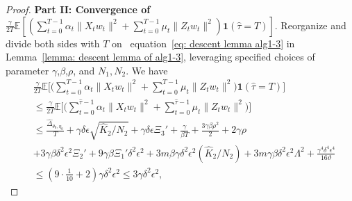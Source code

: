 \documentclass[twoside]{article} %
\def\eqref#1{equation~\ref{#1}}
\theoremstyle{plain}
\theoremstyle{definition}
\theoremstyle{remark}
\newcommand{\htau}{\hat{\tau}}
\begin{document}
\begin{proof}
\textbf{Part II: Convergence of $\frac{\gamma}{2T}\mathbb{E}[(\sum_{t=0}^{T-1}\alpha_t\|X_tw_t\|^2+\sum_{t=0}^{T-1}\mu_t\|Z_tw_t\|^2)\mathbf{1}(\htau = T)]$}.
Reorganize and divide both sides with $T$ on ~\eqref{eq: descent lemma alg1-3} in Lemma~\ref{lemma: descent lemma of alg1-3}, leveraging specified choices of parameter $\gamma$,$\beta$,$\rho$, and $N_1, N_2$. We have
\begin{align}
    &\frac{\gamma}{2T}\mathbb{E}\big[\big(\sum_{t=0}^{T-1}\alpha_t\|X_tw_t\|^2+\sum_{t=0}^{T-1}\mu_t\|Z_tw_t\|^2\big)\mathbf{1}(\htau = T)\big] \nonumber\\
    & \leq \frac{\gamma}{2T}\mathbb{E}\big[\big(\sum_{t=0}^{\htau-1}\alpha_t\|X_tw_t\|^2+\sum_{t=0}^{\htau-1}\mu_t\|Z_tw_t\|^2\big)\big] \nonumber\\
    &\leq \frac{\hat{\Delta}_{\theta_0,\eta_0}}{T} +\gamma \delta\epsilon\sqrt{\hat{K}_2/N_2}+\gamma \delta\epsilon\Xi_3'+\frac{\gamma}{\beta T}+\frac{3\gamma\beta\rho^2}{2} +2\gamma\rho\nonumber\\
    &
    + 3\gamma\beta \delta^2\epsilon^2\Xi_2' + 9\gamma\beta\Xi_1'\delta^2\epsilon^2 + 3m\beta\gamma{\delta^2\epsilon^2}(\hat{K}_2/N_2)+3m\gamma\beta{\delta^2\epsilon^2}\Lambda^2 + \frac{\gamma^4\delta^4\epsilon^4}{16\vartheta}
    \nonumber\\
    &\leq (9\cdot \frac{1}{10}+2)\gamma\delta^2\epsilon^2 \leq 3\gamma\delta^2\epsilon^2,
\end{align}
 


\end{proof}
\end{document}
